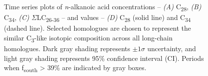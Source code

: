 \begin{figure}[p]
	\caption[\textit{n}-alkanoic acid concentration and  time-series plots]{Time series plots of \textit{n}-alkanoic acid concentrations -- \textit{(A)} C\textsubscript{28}, \textit{(B)} C\textsubscript{34}, \textit{(C)} $\Sigma$LC\textsubscript{26-36} -- and  values -- \textit{(D)} C\textsubscript{28} (solid line) and C\textsubscript{34} (dashed line). Selected homologues are chosen to represent the similar C\textsubscript{3}-like isotopic composition across all long-chain homologues. Dark gray shading represents $\pm 1\sigma$ uncertainty, and light gray shading represents 95\% confidence interval (CI). Periods when f\textsubscript{south} > 39\% are indicated by gray boxes.}
	\label{Ch4Fig:7}
\end{figure}

